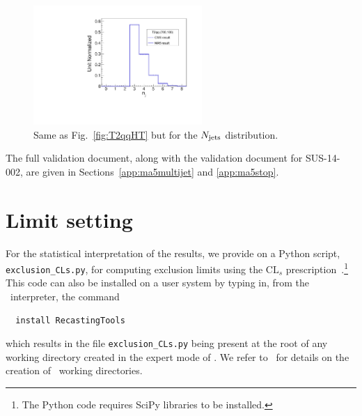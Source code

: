 \begin{figure}
\centering
\includegraphics[width=6.4cm]{figures/madanalysis5/cms-012-T2qqNJets.pdf}
\caption{Same as Fig.~\ref{fig:T2qqHT} but for the $N_{\rm jets}$ distribution.}
\label{fig:T2qqNJets}
\end{figure}

The full validation document, along with the validation document for SUS-14-002, are given in Sections~\ref{app:ma5multijet} and \ref{app:ma5stop}.

\section{Limit setting}\label{sec:CLprocedure}



For the statistical interpretation of the results, we provide on \cite{ma5wiki} a {\sc Python} script, 
{\tt exclusion\_CLs.py}, for computing exclusion limits using the $\mathrm{CL}_s$ prescription~\cite{bib-cls}.\footnote{The
{\sc Python} code requires {\sc SciPy} libraries to be installed.}
This code can also be installed on a user system by typing in, from the \ma\ interpreter, the command
\begin{verbatim}
  install RecastingTools
\end{verbatim}
which results in the file \texttt{exclusion\_CLs.py} being present at the
root of any working directory created in the expert mode of \ma. 
We refer to~\cite{Conte:2014zja,ma5wiki} for details on the creation of \ma\ working directories.


